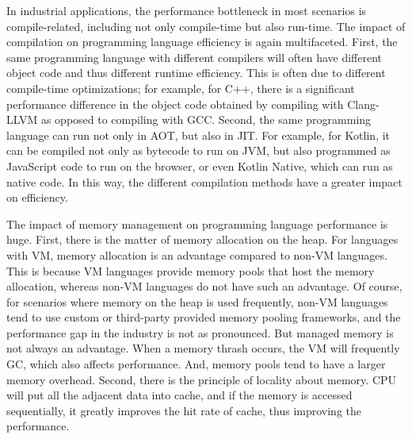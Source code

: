 In industrial applications, the performance bottleneck in most scenarios is compile-related, including not only compile-time but also run-time. The impact of compilation on programming language efficiency is again multifaceted. First, the same programming language with different compilers will often have different object code and thus different runtime efficiency. This is often due to different compile-time optimizations; for example, for C++, there is a significant performance difference in the object code obtained by compiling with Clang-LLVM as opposed to compiling with GCC. Second, the same programming language can run not only in AOT, but also in JIT. For example, for Kotlin, it can be compiled not only as bytecode to run on JVM, but also programmed as JavaScript code to run on the browser, or even Kotlin Native, which can run as native code. In this way, the different compilation methods have a greater impact on efficiency.

The impact of memory management on programming language performance is huge. First, there is the matter of memory allocation on the heap. For languages with VM, memory allocation is an advantage compared to non-VM languages. This is because VM languages provide memory pools that host the memory allocation, whereas non-VM languages do not have such an advantage. Of course, for scenarios where memory on the heap is used frequently, non-VM languages tend to use custom or third-party provided memory pooling frameworks, and the performance gap in the industry is not as pronounced. But managed memory is not always an advantage. When a memory thrash occurs, the VM will frequently GC, which also affects performance. And, memory pools tend to have a larger memory overhead. Second, there is the principle of locality about memory. CPU will put all the adjacent data into cache, and if the memory is accessed sequentially, it greatly improves the hit rate of cache, thus improving the performance.
